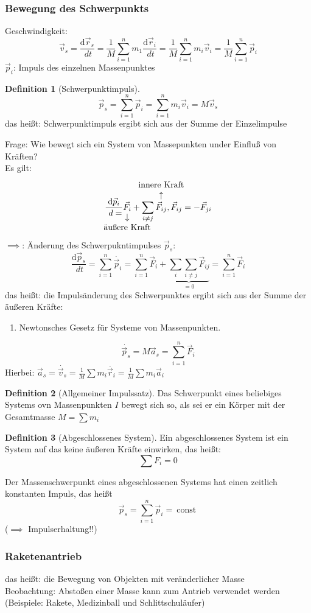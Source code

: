 \documentclass[a4paper]{scrartcl}
\renewcommand{\d}{\mathrm{d}}
\renewcommand{\v}[1]{\vec{#1}}
\newcommand{\dd}[2]{\frac{\d #1}{\ d#2}}
\theoremstyle{definition}
\newtheorem{defn}{Definition}
\theoremstyle{plain}
\theoremstyle{plain}
\theoremstyle{remark}
\theoremstyle{remark}
\theoremstyle{remark}
\begin{document}
\subsubsection{Bewegung des Schwerpunkts}
\label{sec-6-1-1}
Geschwindigkeit:
\[\v v_s = \dd{\v r_s}{t} = \frac{1}{M} \sum_{i = 1}^n m_1 \dd{\v r_i}{t} = \frac{1}{M} \sum_{i = 1}^n m_i \v v_i = \frac{1}{M}\sum_{i = 1}^n \v p_i\]
$\v p_i$: Impuls des einzelnen Massenpunktes
\begin{defn}[Schwerpunktimpuls]
\[\v p_s = \sum_{i = 1}^{n}\v p_i = \sum_{i = 1}^{n} m_i \v v_i = M \v v_s\]
das heißt: Schwerpunktimpuls ergibt sich aus der Summe der Einzelimpulse
\end{defn}
Frage: Wie bewegt sich ein System von Massepunkten under Einfluß von Kräften? \\
    Es gilt:
\[\dd{\v p_i} = \underarrow[\v F_i]{äußere Kraft} + \sum_{i\neq j}^{}\overarrow[\v F_{i j}]{innere Kraft}, \v F_{ij} = - \v F_{j i}\]
$\implies$: Änderung des Schwerpukntimpulses $\v p_s$:
\[ \dd{\v p_s}{t} = \sum_{i = 1}^{n}\dot{\v p_i} = \sum_{i = 1}^{n}\v F_i + \underbrace{ \sum_{i} \sum_{i\neq j} \v F_{ij}}_{= 0} = \sum_{i = 1}^{n} \v F_i\]
das heißt: die Impulsänderung des Schwerpunktes ergibt sich aus der Summe der äußeren Kräfte:
\begin{enumerate}
\item Newtonsches Gesetz für Systeme von Massenpunkten.
\end{enumerate}
\[\dot{\v p_s} = M \v a_s = \sum_{i = 1}^{n}\v F_i\]
Hierbei: $\v a_s = \dot{\v v_s} = \frac{1}{M} \sum m_i \ddot{\v r_i} = \frac{1}{M} \sum m_i \v a_i$

\begin{defn}[Allgemeiner Impulssatz]
Das Schwerpunkt eines beliebiges Systems ovn Massenpunkten $I$ bewegt sich so, als sei er ein Körper mit der Gesamtmasse $M = \sum m_i$
\end{defn}
\begin{defn}[Abgeschlossenes System]
Ein abgeschlossenes System ist ein System auf das keine äußeren Kräfte einwirken, das heißt:
\[\sum F_i = 0\]
\end{defn}

Der Massenschwerpunkt eines abgeschlossenen Systems hat einen zeitlich konstanten Impuls, das heißt
\[\v p_s = \sum_{i = 1}^{n} \v p_i =~\text{const}~\]
($\implies$ Impulserhaltung!!)
\subsubsection{Raketenantrieb}
\label{sec-6-1-2}
das heißt: die Bewegung von Objekten mit veränderlicher Masse \\
    Beobachtung: Abstoßen einer Masse kann zum Antrieb verwendet werden (Beispiele: Rakete, Medizinball und Schlittschuläufer)
\end{document}
